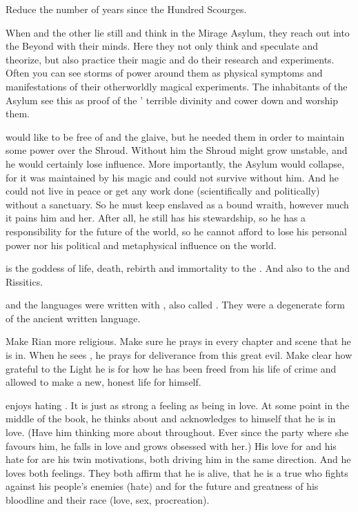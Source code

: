 Reduce the number of years since the Hundred Scourges.

When \Ishnaruchaefir and the other \dragons lie still and think in the Mirage Asylum, they reach out into the Beyond with their minds.
Here they not only think and speculate and theorize, but also practice their magic and do their research and experiments.
Often you can see storms of power around them as physical symptoms and manifestations of their otherworldly magical experiments.
The inhabitants of the Asylum see this as proof of the \dragons' terrible divinity and cower down and worship them.

\Ishnaruchaefir would like to be free of \Rystessakhin and the glaive, but he needed them in order to maintain some power over the Shroud.
Without him the Shroud might grow unstable, and he would certainly lose influence.
More importantly, the Asylum would collapse, for it was maintained by his magic and could not survive without him.
And he could not live in peace or get any work done (scientifically and politically) without a sanctuary.
So he must keep \Rystessakhin enslaved as a bound wraith, however much it pains him and her.
After all, he still has his stewardship, so he has a responsibility for the future of the world, so he cannot afford to lose his personal power nor his political and metaphysical influence on the world.

\KhothSell is the goddess of life, death, rebirth and immortality to the \dragons.
And also to the \Ortaicans and Rissitics.

\Draconic and the \quiljaaran languages were written with , also called .
They were a degenerate form of the ancient \ophidian written language.

Make Rian more religious.
Make sure he prays in every chapter and scene that he is in.
When he sees \Ishnaruchaefir, he prays for deliverance from this great evil.
Make clear how grateful to the Light he is for how he has been freed from his life of crime and allowed to make a new, honest life for himself.

\Teshrial enjoys hating \Ishnaruchaefir.
It is just as strong a feeling as being in love.
At some point in the middle of the book, he thinks about \Firaxel and acknowledges to himself that he is in love.
(Have him thinking more about \Firaxel throughout. Ever since the party where she favours him, he falls in love and grows obsessed with her.)
His love for \Firaxel and his hate for \Ishnaruchaefir are his twin motivations, both driving him in the same direction.
And he loves both feelings.
They both affirm that he is alive, that he is a true \resphan who fights against his people's enemies (hate) and for the future and greatness of his bloodline and their race (love, sex, procreation).

